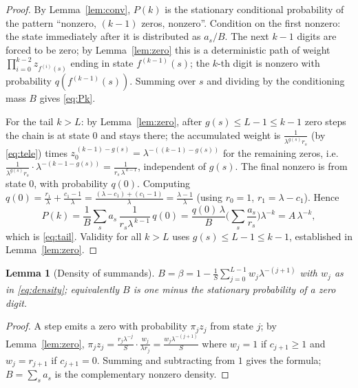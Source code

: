 \documentclass[12pt]{article}
\newtheorem{lemma}{Lemma}
\theoremstyle{definition}
\begin{document}
\begin{proof}
By Lemma~\ref{lem:conv}, $P(k)$ is the stationary conditional probability of the
pattern ``nonzero, $(k-1)$ zeros, nonzero''. Condition on the first nonzero:
the state immediately after it is distributed as $a_s/B$. The next $k-1$ digits
are forced to be zero; by Lemma~\ref{lem:zero} this is a deterministic path of
weight $\prod_{i=0}^{k-2}z_{f^{(i)}(s)}$ ending in state $f^{(k-1)}(s)$; the
$k$-th digit is nonzero with probability $q(f^{(k-1)}(s))$. Summing over $s$ and
dividing by the conditioning mass $B$ gives \eqref{eq:Pk}.

For the tail $k>L$: by Lemma~\ref{lem:zero}, after $g(s)\le L-1\le k-1$ zero
steps the chain is at state $0$ and stays there; the accumulated weight is
$\frac{1}{\lambda^{g(s)}r_s}$ (by \eqref{eq:tele}) times $z_0^{\,(k-1)-g(s)}
=\lambda^{-((k-1)-g(s))}$ for the remaining zeros, i.e.
$\frac{1}{\lambda^{g(s)}r_s}\cdot\lambda^{-(k-1-g(s))}
=\frac{1}{r_s\,\lambda^{\,k-1}}$, independent of $g(s)$. The final nonzero is
from state $0$, with probability $q(0)$. Computing
$q(0)=\frac{r_1}{\lambda}+\frac{c_1-1}{\lambda}
=\frac{(\lambda-c_1)+(c_1-1)}{\lambda}=\frac{\lambda-1}{\lambda}$
(using $r_0=1$, $r_1=\lambda-c_1$). Hence
\[
P(k)=\frac{1}{B}\sum_s a_s\,\frac{1}{r_s\lambda^{\,k-1}}\,q(0)
   =\frac{q(0)\,\lambda}{B}\Big(\sum_s\frac{a_s}{r_s}\Big)\lambda^{-k}
   =A\,\lambda^{-k},
\]
which is \eqref{eq:tail}. Validity for all $k>L$ uses $g(s)\le L-1\le k-1$,
established in Lemma~\ref{lem:zero}.
\end{proof}

\begin{lemma}[Density of summands]\label{lem:base}
$B=\beta=1-\frac1S\sum_{j=0}^{L-1}w_j\lambda^{-(j+1)}$ with $w_j$ as in
\eqref{eq:density}; equivalently $B$ is one minus the stationary probability of a
zero digit.
\end{lemma}

\begin{proof}
A step emits a zero with probability $\pi_jz_j$ from state $j$; by
Lemma~\ref{lem:zero}, $\pi_jz_j=\frac{r_j\lambda^{-j}}{S}\cdot
\frac{w_j}{\lambda r_j}=\frac{w_j\lambda^{-(j+1)}}{S}$ where $w_j=1$ if
$c_{j+1}\ge1$ and $w_j=r_{j+1}$ if $c_{j+1}=0$. Summing and subtracting from $1$
gives the formula; $B=\sum_s a_s$ is the complementary nonzero density.
\end{proof}
\end{document}
